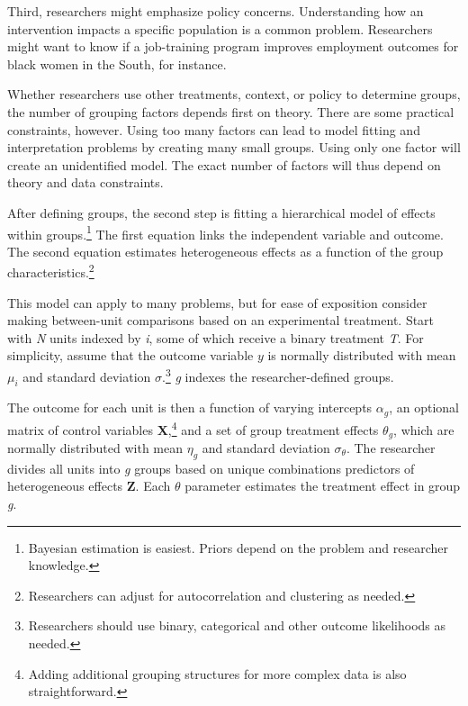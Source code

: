\documentclass[12pt]{article}
\begin{document}
Third, researchers might emphasize policy concerns.
Understanding how an intervention impacts a specific population is a common problem.
Researchers might want to know if a job-training program improves employment outcomes for black women in the South, for instance.  


Whether researchers use other treatments, context, or policy to determine groups, the number of grouping factors depends first on theory.
There are some practical constraints, however.
Using too many factors can lead to model fitting and interpretation problems by creating many small groups.
Using only one factor will create an unidentified model.
The exact number of factors will thus depend on theory and data constraints.  



After defining groups, the second step is fitting a hierarchical model of effects within groups.\footnote{Bayesian estimation is easiest. Priors depend on the problem and researcher knowledge.} 
The first equation links the independent variable and outcome. 
The second equation estimates heterogeneous effects as a function of the group characteristics.\footnote{Researchers can adjust for autocorrelation and clustering as needed.}  


This model can apply to many problems, but for ease of exposition consider making between-unit comparisons based on an experimental treatment.    
Start with \textit{N} units indexed by \textit{i}, some of which receive a binary treatment \textit{T}.
For simplicity, assume that the outcome variable ${y}$ is normally distributed with mean $\mu_i$ and standard deviation $\sigma$.\footnote{Researchers should use binary, categorical and other outcome likelihoods as needed.}
\textit{g} indexes the researcher-defined groups. 


The outcome for each unit is then a function of varying intercepts $\alpha_g$, an optional matrix of control variables \textbf{X},\footnote{Adding additional grouping structures for more complex data is also straightforward.} and a set of group treatment effects $\theta_g$, which are normally distributed with mean $\eta_g$ and standard deviation $\sigma_\theta$. 
The researcher divides all units into \textit{g} groups based on unique combinations predictors of heterogeneous effects \textbf{Z}. 
Each $\theta$ parameter estimates the treatment effect in group \textit{g}.%
\end{document}
